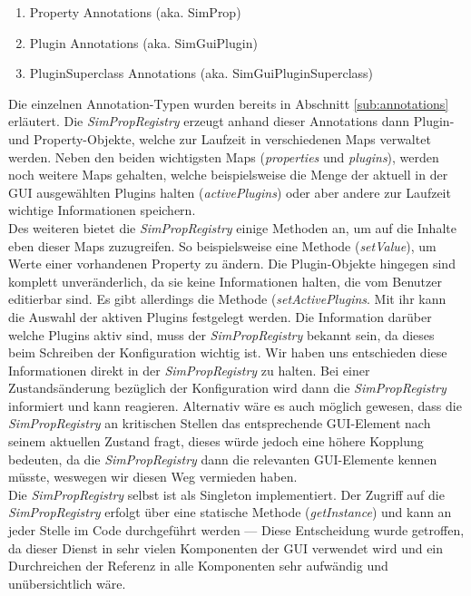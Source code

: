 \documentclass[a4paper, 11pt]{article} %
\begin{document}
\begin{enumerate}
	\item Property Annotations (aka. SimProp)
	\item Plugin Annotations (aka. SimGuiPlugin)
	\item PluginSuperclass Annotations (aka. SimGuiPluginSuperclass)
\end{enumerate}

Die einzelnen Annotation-Typen wurden bereits in Abschnitt \ref{sub:annotations} erläutert. Die \emph{SimPropRegistry} erzeugt anhand dieser Annotations dann Plugin- und Property-Objekte, welche zur Laufzeit in verschiedenen Maps verwaltet werden. Neben den beiden wichtigsten Maps (\emph{properties} und \emph{plugins}), werden noch weitere Maps gehalten, welche beispielsweise die Menge der aktuell in der GUI ausgewählten Plugins halten (\emph{activePlugins}) oder aber andere zur Laufzeit wichtige Informationen speichern.\\

Des weiteren bietet die \emph{SimPropRegistry} einige Methoden an, um auf die Inhalte eben dieser Maps zuzugreifen. So beispielsweise eine Methode (\emph{setValue}), um Werte einer vorhandenen Property zu ändern. Die Plugin-Objekte hingegen sind komplett unveränderlich, da sie keine Informationen halten, die vom Benutzer editierbar sind. Es gibt allerdings die Methode (\emph{setActivePlugins}. Mit ihr kann die Auswahl der aktiven Plugins festgelegt werden. Die Information darüber welche Plugins aktiv sind, muss der \emph{SimPropRegistry} bekannt sein, da dieses beim Schreiben der Konfiguration wichtig ist. Wir haben uns entschieden diese Informationen direkt in der \emph{SimPropRegistry} zu halten. Bei einer Zustandsänderung bezüglich der Konfiguration wird dann die \emph{SimPropRegistry} informiert und kann reagieren. Alternativ wäre es auch möglich gewesen, dass die \emph{SimPropRegistry} an kritischen Stellen das entsprechende GUI-Element nach seinem aktuellen Zustand fragt, dieses würde jedoch eine höhere Kopplung bedeuten, da die \emph{SimPropRegistry} dann die relevanten GUI-Elemente kennen müsste, weswegen wir diesen Weg vermieden haben.\\

Die \emph{SimPropRegistry} selbst ist als Singleton implementiert. Der Zugriff auf die \emph{SimPropRegistry} erfolgt über eine statische Methode (\emph{getInstance}) und kann an jeder Stelle im Code durchgeführt werden --- Diese Entscheidung wurde getroffen, da dieser Dienst in sehr vielen Komponenten der GUI verwendet wird und ein Durchreichen der Referenz in alle Komponenten sehr aufwändig und unübersichtlich wäre. 
\end{document}
